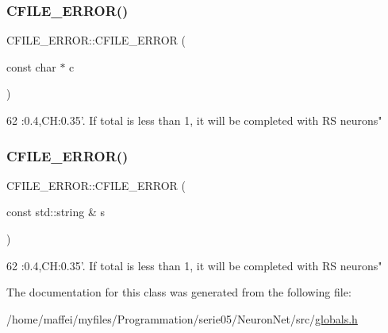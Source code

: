 \subsubsection{\texorpdfstring{C\+F\+I\+L\+E\+\_\+\+E\+R\+R\+O\+R()}{CFILE\_ERROR()}\hspace{0.1cm}{\footnotesize\ttfamily [1/2]}}
{\footnotesize\ttfamily C\+F\+I\+L\+E\+\_\+\+E\+R\+R\+O\+R\+::\+C\+F\+I\+L\+E\+\_\+\+E\+R\+R\+OR (\begin{DoxyParamCaption}\item[{const char $\ast$}]{c }\end{DoxyParamCaption})\hspace{0.3cm}{\ttfamily [inline]}}


\begin{DoxyCode}
62 :0.4,CH:0.35\textcolor{stringliteral}{'. If total is less than 1, it will be completed with RS neurons"}
\end{DoxyCode}
\mbox{\label{classCFILE__ERROR_a20393787ce4998a586a518f0478de5f3}} 
\subsubsection{\texorpdfstring{C\+F\+I\+L\+E\+\_\+\+E\+R\+R\+O\+R()}{CFILE\_ERROR()}\hspace{0.1cm}{\footnotesize\ttfamily [2/2]}}
{\footnotesize\ttfamily C\+F\+I\+L\+E\+\_\+\+E\+R\+R\+O\+R\+::\+C\+F\+I\+L\+E\+\_\+\+E\+R\+R\+OR (\begin{DoxyParamCaption}\item[{const std\+::string \&}]{s }\end{DoxyParamCaption})\hspace{0.3cm}{\ttfamily [inline]}}


\begin{DoxyCode}
62 :0.4,CH:0.35\textcolor{stringliteral}{'. If total is less than 1, it will be completed with RS neurons"}
\end{DoxyCode}


The documentation for this class was generated from the following file\+:\begin{DoxyCompactItemize}
\item 
/home/maffei/myfiles/\+Programmation/serie05/\+Neuron\+Net/src/\hyperlink{globals_8h}{globals.\+h}\end{DoxyCompactItemize}
